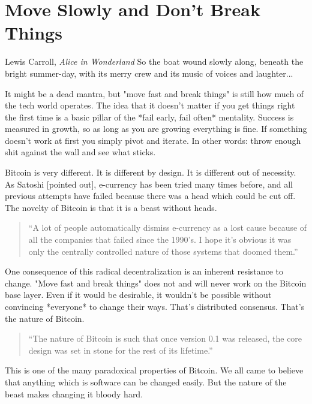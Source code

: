 \chapter{ Move Slowly and Don't Break Things}
\label{les:18}

\begin{chapquote}{Lewis Carroll, \textit{Alice in Wonderland}}
So the boat wound slowly along, beneath the bright summer-day, with its merry crew and its music of voices and laughter...
\end{chapquote}

It might be a dead mantra, but "move fast and break things" is still how
much of the tech world operates. The idea that it doesn't matter if you
get things right the first time is a basic pillar of the *fail early,
fail often* mentality. Success is measured in growth, so as long as you
are growing everything is fine. If something doesn't work at first you
simply pivot and iterate. In other words: throw enough shit against the
wall and see what sticks.

Bitcoin is very different. It is different by design. It is different
out of necessity. As Satoshi [pointed out], e-currency has been tried
many times before, and all previous attempts have failed because there
was a head which could be cut off. The novelty of Bitcoin is that it is
a beast without heads.

\begin{quotation}
``A lot of people automatically dismiss e-currency as a lost cause
because of all the companies that failed since the 1990's. I hope it's
obvious it was only the centrally controlled nature of those systems
that doomed them.''
\end{quotation}

One consequence of this radical decentralization is an inherent
resistance to change. "Move fast and break things" does not and will
never work on the Bitcoin base layer. Even if it would be desirable, it
wouldn't be possible without convincing *everyone* to change their ways.
That's distributed consensus. That's the nature of Bitcoin.

\begin{quotation}
``The nature of Bitcoin is such that once version 0.1 was released, the
core design was set in stone for the rest of its lifetime.''
\end{quotation}

This is one of the many paradoxical properties of Bitcoin. We all came
to believe that anything which is software can be changed easily. But
the nature of the beast makes changing it bloody hard.

